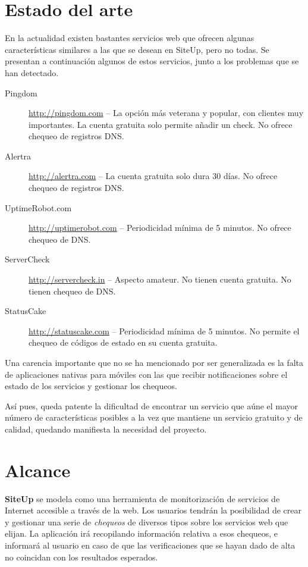 \section{Estado del arte}
\label{sec:estado-del-arte}

En la actualidad existen bastantes servicios web que ofrecen algunas
características similares a las que se desean en SiteUp, pero no todas. Se
presentan a continuación algunos de estos servicios, junto a los problemas que
se han detectado.

\begin{description}
\item[Pingdom] \url{http://pingdom.com} -- La opción más veterana y popular, con
  clientes muy importantes. La cuenta gratuita solo permite añadir un check. No
  ofrece chequeo de registros DNS.
\item[Alertra] \url{http://alertra.com} -- La cuenta gratuita solo dura 30
  días. No ofrece chequeo de registros DNS.
\item[UptimeRobot.com] \url{http://uptimerobot.com} -- Periodicidad mínima de 5
  minutos. No ofrece chequeo de DNS.
\item[ServerCheck] \url{http://servercheck.in} -- Aspecto amateur. No tienen
  cuenta gratuita. No tienen chequeo de DNS.
\item[StatusCake] \url{http://statuscake.com} -- Periodicidad mínima de 5
  minutos. No permite el chequeo de códigos de estado en su cuenta gratuita.

\end{description}

Una carencia importante que no se ha mencionado por ser generalizada es la falta
de aplicaciones nativas para móviles con las que recibir notificaciones sobre el
estado de los servicios y gestionar los chequeos.

Así pues, queda patente la dificultad de encontrar un servicio que aúne el mayor
número de características posibles a la vez que mantiene un servicio gratuito y
de calidad, quedando manifiesta la necesidad del proyecto.


\section{Alcance}
\textbf{SiteUp} se modela como una herramienta de monitorización de servicios de
Internet accesible a través de la web. Los usuarios tendrán la posibilidad de
crear y gestionar una serie de \textit{chequeos} de diversos tipos sobre los
servicios web que elijan. La aplicación irá recopilando información relativa a
esos chequeos, e informará al usuario en caso de que las verificaciones que se
hayan dado de alta no coincidan con los resultados esperados.

